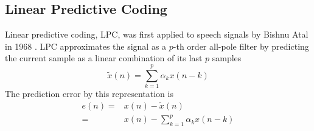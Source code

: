\subsection{Linear Predictive Coding} %
\label{sub:linear_predictive_coding}
Linear predictive coding, LPC, was first applied to speech signals by Bishnu Atal \etal in 1968 \cite{atal68}. LPC approximates the signal as a $p$-th order all-pole filter by predicting the current sample as a linear combination of its last $p$ samples \cite{digsig}
\begin{equation}
	\tilde{x}(n) = \sum_{k=1}^{p}\alpha_k x(n-k)
\end{equation}
The prediction error by this representation is 
\begin{equation}
	\begin{split}
		e(n)= & x(n)-\tilde{x}(n) \\
		= & x(n)-\sum_{k=1}^{p}\alpha_k x(n-k)
	\end{split}
\end{equation}

